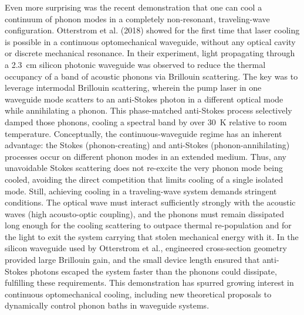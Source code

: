 Even more surprising was the recent demonstration that one can cool a continuum of phonon modes in a completely non-resonant, traveling-wave configuration. \cite{otterstrom2018optomechanical} Otterstrom et al. (2018) showed for the first time that laser cooling is possible in a continuous optomechanical waveguide, without any optical cavity or discrete mechanical resonance. In their experiment, light propagating through a \SI{2.3}{\centi\meter} silicon photonic waveguide was observed to reduce the thermal occupancy of a band of acoustic phonons via Brillouin scattering. The key was to leverage intermodal Brillouin scattering, wherein the pump laser in one waveguide mode scatters to an anti-Stokes photon in a different optical mode while annihilating a phonon. This phase-matched anti-Stokes process selectively damped those phonons, cooling a spectral band by over \SI{30}{\kelvin} relative to room temperature. Conceptually, the continuous-waveguide regime has an inherent advantage: the Stokes (phonon-creating) and anti-Stokes (phonon-annihilating) processes occur on different phonon modes in an extended medium. Thus, any unavoidable Stokes scattering does not re-excite the very phonon mode being cooled, avoiding the direct competition that limits cooling of a single isolated mode. Still, achieving cooling in a traveling-wave system demands stringent conditions. The optical wave must interact sufficiently strongly with the acoustic waves (high acousto-optic coupling), and the phonons must remain dissipated long enough for the cooling scattering to outpace thermal re-population and for the light to exit the system carrying that stolen mechanical energy with it. In the silicon waveguide used by Otterstrom et al., engineered cross-section geometry provided large Brillouin gain, and the small device length ensured that anti-Stokes photons escaped the system faster than the phonons could dissipate, fulfilling these requirements. \cite{otterstrom2018optomechanical} This demonstration has spurred growing interest in continuous optomechanical cooling, including new theoretical proposals to dynamically control phonon baths in waveguide systems. \cite{zhu2023dynamic}

